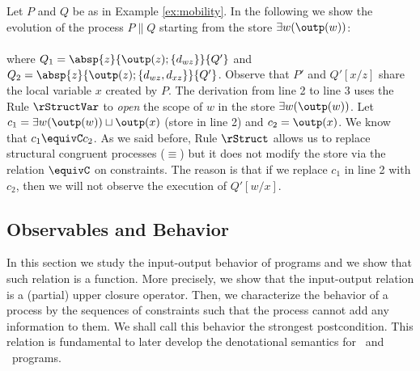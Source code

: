 \documentclass{tlp}
\begin{document}
\begin{example}\label{ex:ex-mob-sos}
Let $P$ and $Q$ be as in Example \ref{ex:mobility}. 
In the following we show the evolution of the process  $ P \parallel Q$ starting from the store  $\exists w (\outp(w))$:\\

\\


where $Q_1= \absp{z}{\outp(z);\{d_{wz}\}}{Q'}$
and $Q_2= \absp{z}{\outp(z);\{d_{wz},d_{xz}\}}{Q'}$.  Observe that $P'$ and $Q'[x/z]$ share the local variable $x$ created by $P$. The derivation from line 2 to line 3   uses the Rule $\rStructVar$ to \emph{open} the scope of $w$ in the store $\exists w (\outp(w))$. 
Let $c_1 = \exists w(\outp(w)) \sqcup \outp(x)$  (store in line 2) and $c_2 = \outp(x)$. We know that $c_1 \equivC c_2$. 
 As we said before,  Rule $\rStruct$  allows us to replace structural congruent processes ($\equiv$) but it does not  modify the store via the   relation $\equivC$  on constraints. The reason is that if we replace $c_1$ in line 2 with  $c_2$, then we will not observe the execution of $Q'[w/x]$. 
\end{example}

\subsection{Observables and  Behavior} \label{sec:observables}
In this section we study the input-output behavior of programs and we show that such relation is a function. More precisely, we show that the input-output relation is a (partial) upper closure operator. Then, we characterize the behavior of a process by the sequences of constraints such that the process cannot add any information to them. We shall call this behavior the strongest postcondition. This relation is fundamental to later develop the denotational semantics for \tccp\ and \utcc\ programs. 
\end{document}
